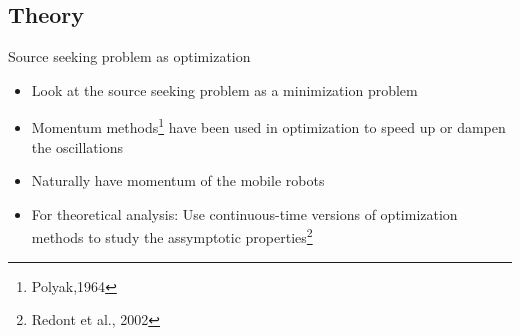 \subsection{Theory}
\begin{frame}{Source seeking problem as optimization}
\begin{itemize} 
	\item Look at the source seeking problem as a minimization problem
	\item Momentum methods\footnote{Polyak,1964} have been used in optimization to speed up or dampen the oscillations
	\item Naturally have momentum of the mobile robots   
	\item For theoretical analysis: Use continuous-time versions of optimization methods to study the assymptotic properties\footnote{Redont et al., 2002} 
\end{itemize}
\end{frame}
